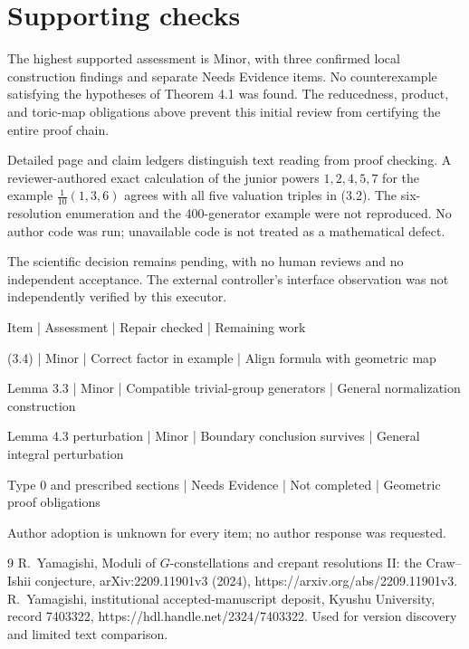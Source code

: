 \documentclass[10pt]{article}
\begin{document}
\section*{Supporting checks}
The highest supported assessment is Minor, with three confirmed local construction findings and separate Needs Evidence items. No counterexample satisfying the hypotheses of Theorem 4.1 was found. The reducedness, product, and toric-map obligations above prevent this initial review from certifying the entire proof chain.\par
Detailed page and claim ledgers distinguish text reading from proof checking. A reviewer-authored exact calculation of the junior powers \(1,2,4,5,7\) for the example \(\frac1{10}(1,3,6)\) agrees with all five valuation triples in (3.2). The six-resolution enumeration and the 400-generator example were not reproduced. No author code was run; unavailable code is not treated as a mathematical defect.\par
The scientific decision remains pending, with no human reviews and no independent acceptance. The external controller’s interface observation was not independently verified by this executor.\par
Item | Assessment | Repair checked | Remaining work\par
(3.4) | Minor | Correct factor in example | Align formula with geometric map\par
Lemma 3.3 | Minor | Compatible trivial-group generators | General normalization construction\par
Lemma 4.3 perturbation | Minor | Boundary conclusion survives | General integral perturbation\par
Type 0 and prescribed sections | Needs Evidence | Not completed | Geometric proof obligations\par
Author adoption is unknown for every item; no author response was requested.\par
9 R. Yamagishi, Moduli of \(G\)-constellations and crepant resolutions II: the Craw–Ishii conjecture, arXiv:2209.11901v3 (2024), https://arxiv.org/abs/2209.11901v3. R. Yamagishi, institutional accepted-manuscript deposit, Kyushu University, record 7403322, https://hdl.handle.net/2324/7403322. Used for version discovery and limited text comparison.\par
\end{document}
